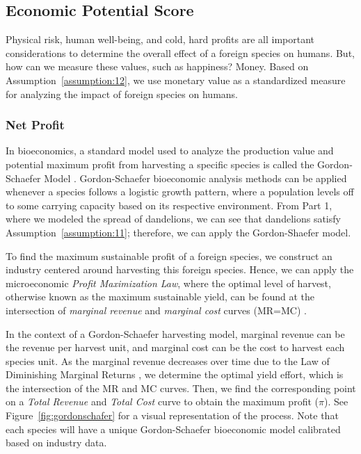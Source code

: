 \subsection{Economic Potential Score}
Physical risk, human well-being, and cold, hard profits are all important considerations to determine the overall effect of a foreign species on humans. But, how can we measure these values, such as happiness? Money. Based on Assumption~\ref{assumption:12}, we use monetary value as a standardized measure for analyzing the impact of foreign species on humans.

\subsubsection{Net Profit}

In bioeconomics, a standard model used to analyze the production value and potential maximum profit from harvesting a specific species is called the Gordon-Schaefer Model \cite{wikipediaGordonSchaeferModel}. Gordon-Schaefer bioeconomic analysis methods can be applied whenever a species follows a logistic growth pattern, where a population levels off to some carrying capacity based on its respective environment. From Part 1, where we modeled the spread of dandelions, we can see that dandelions satisfy Assumption~\ref{assumption:11}; therefore, we can apply the Gordon-Shaefer model.

To find the maximum sustainable profit of a foreign species, we construct an industry centered around harvesting this foreign species. Hence, we can apply the microeconomic \textit{Profit Maximization Law}, where the optimal level of harvest, otherwise known as the maximum sustainable yield, can be found at the intersection of \textit{marginal revenue} and \textit{marginal cost} curves (MR=MC) \cite{intelligenteconomistProfitMaximization}.

In the context of a Gordon-Schaefer harvesting model, marginal revenue can be the revenue per harvest unit, and marginal cost can be the cost to harvest each species unit. As the marginal revenue decreases over time due to the Law of Diminishing Marginal Returns \cite{investopediaDiminishingMarginal}, we determine the optimal yield effort, which is the intersection of the MR and MC curves. Then, we find the corresponding point on a \textit{Total Revenue} and \textit{Total Cost} curve to obtain the maximum profit (\(\pi\)). See Figure~\ref{fig:gordonschafer} for a visual representation of the process. Note that each species will have a unique Gordon-Schaefer bioeconomic model calibrated based on industry data.

